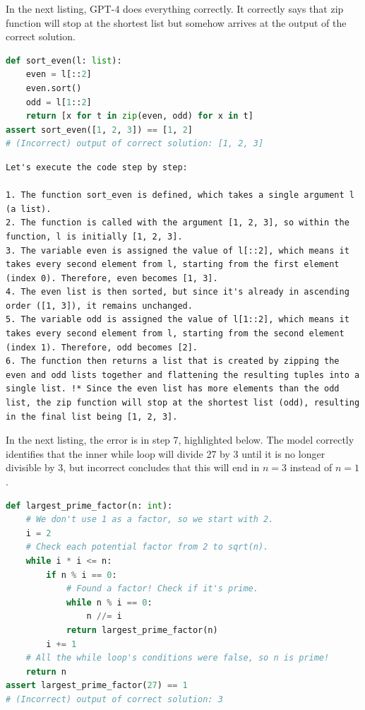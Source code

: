 \noindent In the next listing, GPT-4 does everything correctly. It correctly says that zip function will stop at the shortest list but somehow arrives at the output of the correct solution.

\begin{lstlisting}[language=Python, frame=single]
def sort_even(l: list):
    even = l[::2]
    even.sort()
    odd = l[1::2]
    return [x for t in zip(even, odd) for x in t]
assert sort_even([1, 2, 3]) == [1, 2]
# (Incorrect) output of correct solution: [1, 2, 3]
\end{lstlisting}

\begin{lstlisting}[frame=single, belowskip=20pt]
Let's execute the code step by step:

1. The function sort_even is defined, which takes a single argument l (a list).
2. The function is called with the argument [1, 2, 3], so within the function, l is initially [1, 2, 3].
3. The variable even is assigned the value of l[::2], which means it takes every second element from l, starting from the first element (index 0). Therefore, even becomes [1, 3].
4. The even list is then sorted, but since it's already in ascending order ([1, 3]), it remains unchanged.
5. The variable odd is assigned the value of l[1::2], which means it takes every second element from l, starting from the second element (index 1). Therefore, odd becomes [2].
6. The function then returns a list that is created by zipping the even and odd lists together and flattening the resulting tuples into a single list. !* Since the even list has more elements than the odd list, the zip function will stop at the shortest list (odd), resulting in the final list being [1, 2, 3].
\end{lstlisting}

\noindent In the next listing, the error is in step 7, highlighted below. The model correctly identifies that the inner while loop will divide 27 by 3 until it is no longer divisible by 3, but incorrect concludes that this will end in $n=3$ instead of $n=1$.

\begin{lstlisting}[language=Python, frame=single]
def largest_prime_factor(n: int):
    # We don't use 1 as a factor, so we start with 2.
    i = 2
    # Check each potential factor from 2 to sqrt(n).
    while i * i <= n:
        if n % i == 0:
            # Found a factor! Check if it's prime.
            while n % i == 0:
                n //= i
            return largest_prime_factor(n)
        i += 1
    # All the while loop's conditions were false, so n is prime!
    return n
assert largest_prime_factor(27) == 1
# (Incorrect) output of correct solution: 3
\end{lstlisting}

